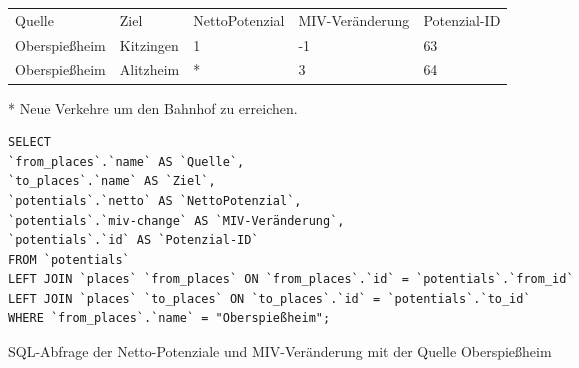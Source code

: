 \begin{tabularx}{\textwidth}{*5{X}}
Quelle & Ziel & NettoPotenzial & MIV-Veränderung & Potenzial-ID\\ 
Oberspießheim & Kitzingen & 1 & -1 & 63\\ 
Oberspießheim & Alitzheim & * & 3 & 64\\ 
\end{tabularx}
\newline
\newline
* Neue Verkehre um den Bahnhof zu erreichen.
\newline
\begin{listing}[htbp]
\begin{verbatim}
SELECT
`from_places`.`name` AS `Quelle`, 
`to_places`.`name` AS `Ziel`, 
`potentials`.`netto` AS `NettoPotenzial`, 
`potentials`.`miv-change` AS `MIV-Veränderung`, 
`potentials`.`id` AS `Potenzial-ID`
FROM `potentials`
LEFT JOIN `places` `from_places` ON `from_places`.`id` = `potentials`.`from_id`
LEFT JOIN `places` `to_places` ON `to_places`.`id` = `potentials`.`to_id`
WHERE `from_places`.`name` = "Oberspießheim";
\end{verbatim}
\caption{SQL-Abfrage der Netto-Potenziale und MIV-Veränderung mit der Quelle Oberspießheim}\label{lst-fz-oberspiessheim}
\end{listing}